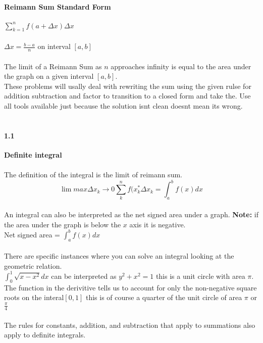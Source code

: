 \documentclass[14pt]{extreport}
\begin{document}
\textbf{Reimann Sum Standard Form}\\\\
$\sum_{k=1}^{n}f(a+\Delta x)\Delta x$\\\\
$\Delta x = \frac{b-a}{n}$ on interval $[a, b]$\\\\
The limit of a Reimann Sum as $n$ approaches infinity is equal to the area under the graph on a given interval $[a, b]$.\\
These problems will usally deal with rewriting the sum using the given rulse for addition subtraction and factor to transition to
a closed form and take the. Use all tools available just because the solution isnt clean doesnt mean its wrong.\\\\

\paragraph{1.1} \textbf{Definite integral}\\\\

The definition of the integral is the limit of reimann sum.\\
$$\lim max \Delta x_k \to 0 \sum_{k}^{n} f(x_{k}^* \Delta x_k = \int_{a}^{b} f(x)dx$$\\

An integral can also be interpreted as the net signed area under a graph. \textbf{Note:} if the area under the graph is below the $x$ axis it is negative.\\

Net signed area = $\int_{a}^{b} f(x)dx$\\\\

There are specific instances where you can solve an integral looking at the geometric relation.\\

$\int_{0}^{1} \sqrt{x-x^2}dx$ can be interpreted as $y^2+x^2=1$ this is a unit circle with area $\pi$.  The function in the derivitive tells us to account for only the non-negative square roots on the interal$[0,1]$ this is of course a quarter of the unit circle of area $\pi$ or $\frac{\pi}{4}$\\\\

The rules for constants, addition, and subtraction that apply to summations also apply to definite integrals.\\\\
\end{document}
